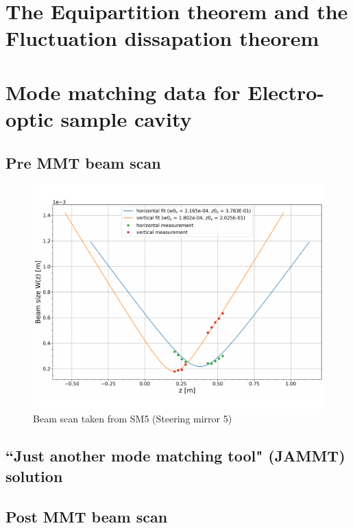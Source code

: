 
\section{The Equipartition theorem and the Fluctuation dissapation theorem}

\newpage


\section{Mode matching data for Electro-optic sample cavity}
\subsection{Pre MMT beam scan}

\begin{figure}[H]
\includegraphics[width=\textwidth]{figs/ALGAAS/beam_scans/12_18_2020_preMMT.pdf}
\caption{Beam scan taken from SM5 (Steering mirror 5)}
\label{fig:beam_scan_2020}
\end{figure}


\subsection{``Just another mode matching tool" (JAMMT) solution}

\subsection{Post MMT beam scan}


